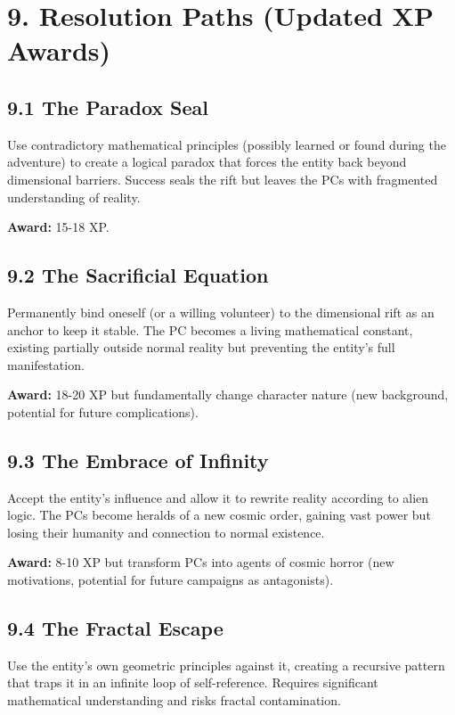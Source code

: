 \documentclass[11pt]{article}
\begin{document}
\clearpage

\section*{9. Resolution Paths (Updated XP Awards)}

\subsection*{9.1 The Paradox Seal}

Use contradictory mathematical principles (possibly learned or found during the adventure) to create a logical paradox that forces the entity back beyond dimensional barriers. Success seals the rift but leaves the PCs with fragmented understanding of reality.

\textbf{Award:} 15-18 XP.

\subsection*{9.2 The Sacrificial Equation}

Permanently bind oneself (or a willing volunteer) to the dimensional rift as an anchor to keep it stable. The PC becomes a living mathematical constant, existing partially outside normal reality but preventing the entity's full manifestation.

\textbf{Award:} 18-20 XP but fundamentally change character nature (new background, potential for future complications).

\subsection*{9.3 The Embrace of Infinity}

Accept the entity's influence and allow it to rewrite reality according to alien logic. The PCs become heralds of a new cosmic order, gaining vast power but losing their humanity and connection to normal existence.

\textbf{Award:} 8-10 XP but transform PCs into agents of cosmic horror (new motivations, potential for future campaigns as antagonists).

\subsection*{9.4 The Fractal Escape}

Use the entity's own geometric principles against it, creating a recursive pattern that traps it in an infinite loop of self-reference. Requires significant mathematical understanding and risks fractal contamination.
\end{document}
